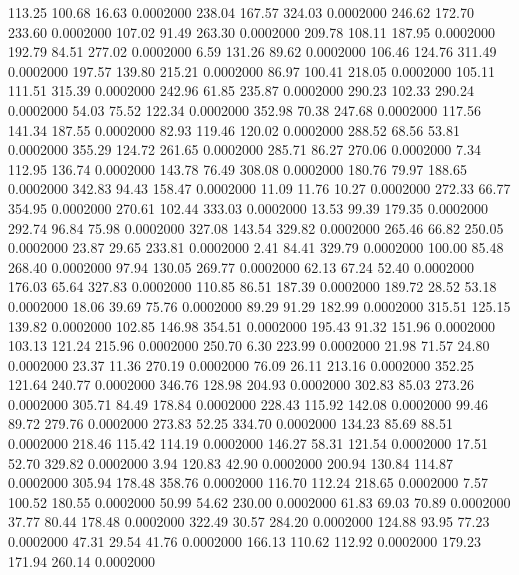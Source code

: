  113.25  100.68   16.63   0.0002000
 238.04  167.57  324.03   0.0002000
 246.62  172.70  233.60   0.0002000
 107.02   91.49  263.30   0.0002000
 209.78  108.11  187.95   0.0002000
 192.79   84.51  277.02   0.0002000
   6.59  131.26   89.62   0.0002000
 106.46  124.76  311.49   0.0002000
 197.57  139.80  215.21   0.0002000
  86.97  100.41  218.05   0.0002000
 105.11  111.51  315.39   0.0002000
 242.96   61.85  235.87   0.0002000
 290.23  102.33  290.24   0.0002000
  54.03   75.52  122.34   0.0002000
 352.98   70.38  247.68   0.0002000
 117.56  141.34  187.55   0.0002000
  82.93  119.46  120.02   0.0002000
 288.52   68.56   53.81   0.0002000
 355.29  124.72  261.65   0.0002000
 285.71   86.27  270.06   0.0002000
   7.34  112.95  136.74   0.0002000
 143.78   76.49  308.08   0.0002000
 180.76   79.97  188.65   0.0002000
 342.83   94.43  158.47   0.0002000
  11.09   11.76   10.27   0.0002000
 272.33   66.77  354.95   0.0002000
 270.61  102.44  333.03   0.0002000
  13.53   99.39  179.35   0.0002000
 292.74   96.84   75.98   0.0002000
 327.08  143.54  329.82   0.0002000
 265.46   66.82  250.05   0.0002000
  23.87   29.65  233.81   0.0002000
   2.41   84.41  329.79   0.0002000
 100.00   85.48  268.40   0.0002000
  97.94  130.05  269.77   0.0002000
  62.13   67.24   52.40   0.0002000
 176.03   65.64  327.83   0.0002000
 110.85   86.51  187.39   0.0002000
 189.72   28.52   53.18   0.0002000
  18.06   39.69   75.76   0.0002000
  89.29   91.29  182.99   0.0002000
 315.51  125.15  139.82   0.0002000
 102.85  146.98  354.51   0.0002000
 195.43   91.32  151.96   0.0002000
 103.13  121.24  215.96   0.0002000
 250.70    6.30  223.99   0.0002000
  21.98   71.57   24.80   0.0002000
  23.37   11.36  270.19   0.0002000
  76.09   26.11  213.16   0.0002000
 352.25  121.64  240.77   0.0002000
 346.76  128.98  204.93   0.0002000
 302.83   85.03  273.26   0.0002000
 305.71   84.49  178.84   0.0002000
 228.43  115.92  142.08   0.0002000
  99.46   89.72  279.76   0.0002000
 273.83   52.25  334.70   0.0002000
 134.23   85.69   88.51   0.0002000
 218.46  115.42  114.19   0.0002000
 146.27   58.31  121.54   0.0002000
  17.51   52.70  329.82   0.0002000
   3.94  120.83   42.90   0.0002000
 200.94  130.84  114.87   0.0002000
 305.94  178.48  358.76   0.0002000
 116.70  112.24  218.65   0.0002000
   7.57  100.52  180.55   0.0002000
  50.99   54.62  230.00   0.0002000
  61.83   69.03   70.89   0.0002000
  37.77   80.44  178.48   0.0002000
 322.49   30.57  284.20   0.0002000
 124.88   93.95   77.23   0.0002000
  47.31   29.54   41.76   0.0002000
 166.13  110.62  112.92   0.0002000
 179.23  171.94  260.14   0.0002000

